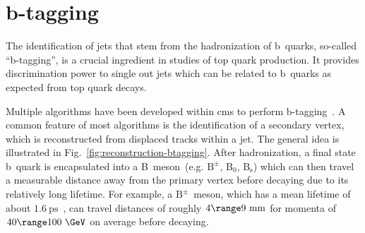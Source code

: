 \section{b-tagging}
\label{sec:reconstruction-btagging}

The identification of jets that stem from the hadronization of b~quarks, so-called ``b-tagging'', is a crucial ingredient in studies of top quark production. It provides discrimination power to single out jets which can be related to b~quarks as expected from top quark decays.

Multiple algorithms have been developed within \gls{cms} to perform b-tagging~\cite{Chatrchyan:2012jua,CMS-PAS-BTV-15-001}. A common feature of most algorithms is the identification of a secondary vertex, which is reconstructed from displaced tracks within a jet. The general idea is illustrated in Fig.~\ref{fig:reconstruction-btagging}. After hadronization, a final state b~quark is encapsulated into a B~meson~(e.g. $\mathrm{B}^{\pm}$, $\mathrm{B}_{0}$, $\mathrm{B}_\mathrm{s}$) which can then travel a measurable distance away from the primary vertex before decaying due to its relatively long lifetime. For example, a $\mathrm{B}^{\pm}$~meson, which has a mean lifetime of about $1.6~\mathrm{ps}$~\cite{Olive:2016xmw}, can travel distances of roughly $4\range9~\mathrm{mm}$ for momenta of $40\range100~\GeV$ on average before decaying.


